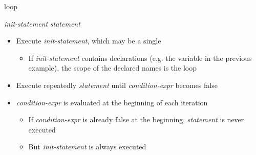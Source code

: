 \begin{frame}[fragile]{ loop}

   \textit{init-statement}  \code{;}
   \code{)} \textit{statement}

  \pause

  \begin{itemize}[<+->]
  \item Execute \textit{init-statement}, which may be a single \code{;}
    \begin{itemize}
    \item If \textit{init-statement} contains declarations (e.g. the 
      variable in the previous example), the scope of the declared names is
      the loop
    \end{itemize}
  \item Execute repeatedly \textit{statement} until \textit{condition-expr} becomes false
  \item \textit{condition-expr} is evaluated at the beginning of each iteration
    \begin{itemize}
    \item If \textit{condition-expr} is already false at the beginning,
      \textit{statement} is never executed
    \item But \textit{init-statement} is always executed
    \end{itemize}
  \end{itemize}

\end{frame}

